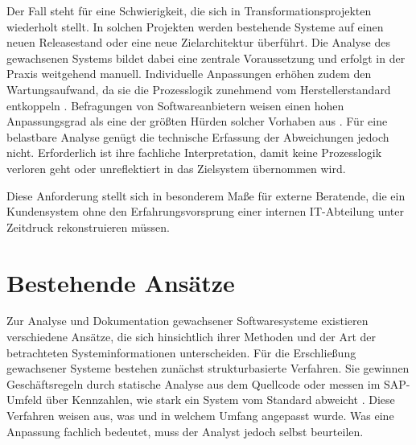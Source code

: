 Der Fall steht für eine Schwierigkeit, die sich in Transformationsprojekten wiederholt stellt. In solchen Projekten werden bestehende Systeme auf einen neuen Releasestand oder eine neue Zielarchitektur überführt. Die Analyse des gewachsenen Systems bildet dabei eine zentrale Voraussetzung und erfolgt in der Praxis weitgehend manuell. %
Individuelle Anpassungen erhöhen zudem den Wartungsaufwand, da sie die Prozesslogik zunehmend vom Herstellerstandard entkoppeln \cite{light_maintenance_2001}. Befragungen von Softwareanbietern weisen einen hohen Anpassungsgrad als eine der größten Hürden solcher Vorhaben aus \cite{reinicke_survey_nodate, noauthor_new_nodate}. Für eine belastbare Analyse genügt die technische Erfassung der Abweichungen jedoch nicht. Erforderlich ist ihre fachliche Interpretation, damit keine Prozesslogik verloren geht oder unreflektiert in das Zielsystem übernommen wird.

Diese Anforderung stellt sich in besonderem Maße für externe Beratende, die ein Kundensystem ohne den Erfahrungsvorsprung einer internen IT-Abteilung unter Zeitdruck rekonstruieren müssen. 

\section{Bestehende Ansätze}
\label{sec:einordnung}
Zur Analyse und Dokumentation gewachsener Softwaresysteme existieren verschiedene Ansätze, die sich hinsichtlich ihrer Methoden und der Art der betrachteten Systeminformationen unterscheiden. 
Für die Erschließung gewachsener Systeme bestehen zunächst strukturbasierte Verfahren. Sie gewinnen Geschäftsregeln durch statische Analyse aus dem Quellcode \cite{paradauskas_business_2006} oder messen im SAP-Umfeld über Kennzahlen, wie stark ein System vom Standard abweicht \cite{nuttgens_reverse_1999, sekatzek_messung_2009}. Diese Verfahren weisen aus, was und in welchem Umfang angepasst wurde. Was eine Anpassung fachlich bedeutet, muss der Analyst jedoch selbst beurteilen.
 
